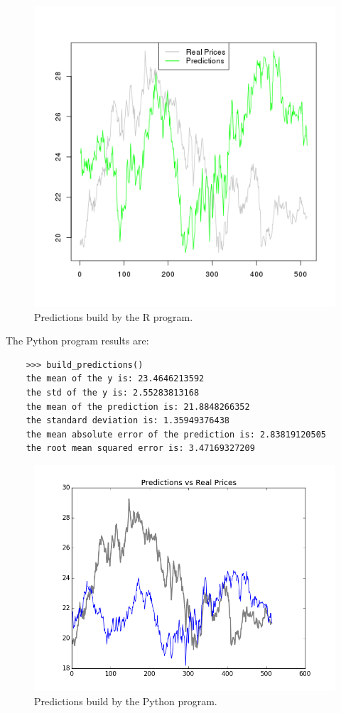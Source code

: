 \documentclass[
  twoside,
  11pt, a4paper,
  footinclude=true,
  headinclude=true,
  cleardoublepage=empty
]{scrreprt}
\begin{document}
    \begin{figure}[H]
        \includegraphics[scale=0.5]{RPredicitions.png}
        \centering
        \caption{Predictions build by the R program.}
        \label{fig:RPredicitions}
    \end{figure}
    
    The Python program results are:
    \begin{verbatim}
    >>> build_predictions()
    the mean of the y is: 23.4646213592
    the std of the y is: 2.55283813168
    the mean of the prediction is: 21.8848266352
    the standard deviation is: 1.35949376438
    the mean absolute error of the prediction is: 2.83819120505
    the root mean squared error is: 3.47169327209
    \end{verbatim}
    
    \begin{figure}[H]
        \includegraphics[scale=0.5]{PythonPredictions.png}
        \centering
        \caption{Predictions build by the Python program.}
        \label{fig:PythonPredictions}
    \end{figure}
\end{document}

